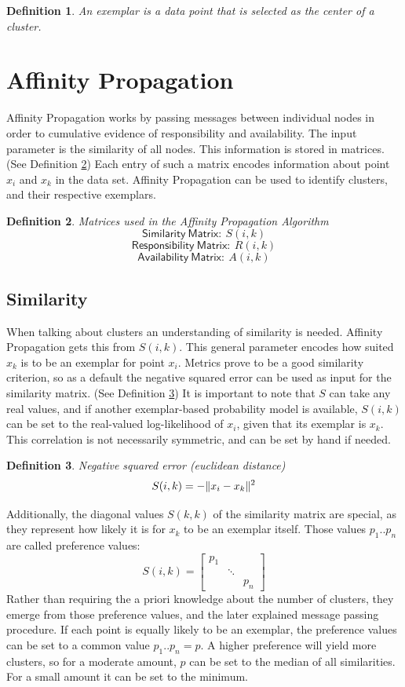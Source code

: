 \documentclass[11pt,a4paper]{article}
\newtheorem{definition}{Definition}
\DeclarePairedDelimiter\norm{\lVert}{\rVert}
\begin{document}
\begin{definition}\label{def:exemplar}
	An exemplar is a data point that is selected as the center of a cluster.
\end{definition}

\pagebreak
\section{Affinity Propagation}

Affinity Propagation works by passing messages between individual nodes in order to cumulative evidence of responsibility and availability. The input parameter is the similarity of all nodes. This information is stored in matrices. (See Definition \ref{def:matrices}) Each entry of such a matrix encodes information about point $x_i$ and $x_k$ in the data set. Affinity Propagation can be used to identify clusters, and their respective exemplars.
\begin{definition}\label{def:matrices}
	Matrices used in the Affinity Propagation Algorithm
	\[
		\mathsf{Similarity\ Matrix:}\  S(i,k) 
	\]
	\[
		\mathsf{Responsibility\ Matrix:}\  R(i,k) 
	\]
	\[
		\mathsf{Availability\ Matrix:}\  A(i,k) 
	\]
\end{definition}
\subsection{Similarity}
When talking about clusters an understanding of similarity is needed. Affinity Propagation gets this from $S(i,k)$. This general parameter encodes how suited $x_k$ is to be an exemplar for point $x_i$. Metrics prove to be a good similarity criterion, so as a default the negative squared error can be used as input for the similarity matrix. \cite{frey2007clustering} (See Definition \ref{def:negsquared}) It is important to note that $S$ can take any real values, and if another exemplar-based probability model is available, $S(i,k)$ can be set to the real-valued log-likelihood of $x_i$, given that its exemplar is $x_k$. This correlation is not necessarily symmetric, and can be set by hand if needed. \cite{frey2007clustering}
\begin{definition}\label{def:negsquared}
	Negative squared error (euclidean distance)
	\[
		S(i,k) = - \norm{x_i - x_k}^2
	\]
\end{definition}
Additionally, the diagonal values $S(k,k)$ of the similarity matrix are special, as they represent how likely it is for $x_k$ to be an exemplar itself. Those values $p_1 .. p_n$ are called preference values:
\[
	S(i,k) = \begin{bmatrix}p_{1} & & \\ & \ddots & \\ & & p_{n}\end{bmatrix}
\]
Rather than requiring the a priori knowledge about the number of clusters, they emerge from those preference values, and the later explained message passing procedure. If each point is equally likely to be an exemplar, the preference values can be set to a common value $p_1..p_n = p$. A higher preference will yield more clusters, so for a moderate amount, $p$ can be set to the median of all similarities. For a small amount it can be set to the minimum. \cite{frey2007clustering}
\end{document}
